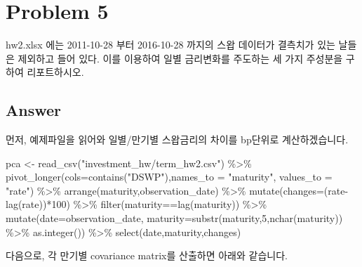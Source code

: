 \documentclass[
  a4paper,
  DIV=11,
  numbers=noendperiod]{scrreprt}
\newenvironment{Shaded}{\begin{snugshade}}{\end{snugshade}}
\newcommand{\AttributeTok}[1]{\textcolor[rgb]{0.40,0.45,0.13}{#1}}
\newcommand{\DecValTok}[1]{\textcolor[rgb]{0.68,0.00,0.00}{#1}}
\newcommand{\FunctionTok}[1]{\textcolor[rgb]{0.28,0.35,0.67}{#1}}
\newcommand{\NormalTok}[1]{\textcolor[rgb]{0.00,0.23,0.31}{#1}}
\newcommand{\OtherTok}[1]{\textcolor[rgb]{0.00,0.23,0.31}{#1}}
\newcommand{\SpecialCharTok}[1]{\textcolor[rgb]{0.37,0.37,0.37}{#1}}
\newcommand{\StringTok}[1]{\textcolor[rgb]{0.13,0.47,0.30}{#1}}
\begin{document}
\section*{Problem 5}\label{problem-5}


hw2.xlsx 에는 2011-10-28 부터 2016-10-28 까지의 스왑 데이터가 결측치가
있는 날들은 제외하고 들어 있다. 이를 이용하여 일별 금리변화를 주도하는
세 가지 주성분을 구하여 리포트하시오.

\subsection*{Answer}\label{answer-9}

먼저, 예제파일을 읽어와 일별/만기별 스왑금리의 차이를 bp단위로
계산하겠습니다.

\begin{Shaded}
\begin{Highlighting}[]
\NormalTok{pca }\OtherTok{\textless{}{-}} \FunctionTok{read\_csv}\NormalTok{(}\StringTok{"investment\_hw/term\_hw2.csv"}\NormalTok{) }\SpecialCharTok{\%\textgreater{}\%} 
  \FunctionTok{pivot\_longer}\NormalTok{(}\AttributeTok{cols=}\FunctionTok{contains}\NormalTok{(}\StringTok{"DSWP"}\NormalTok{),}\AttributeTok{names\_to =} \StringTok{"maturity"}\NormalTok{, }\AttributeTok{values\_to =} \StringTok{"rate"}\NormalTok{) }\SpecialCharTok{\%\textgreater{}\%} 
  \FunctionTok{arrange}\NormalTok{(maturity,observation\_date) }\SpecialCharTok{\%\textgreater{}\%} 
  \FunctionTok{mutate}\NormalTok{(}\AttributeTok{changes=}\NormalTok{(rate}\SpecialCharTok{{-}}\FunctionTok{lag}\NormalTok{(rate))}\SpecialCharTok{*}\DecValTok{100}\NormalTok{) }\SpecialCharTok{\%\textgreater{}\%} 
  \FunctionTok{filter}\NormalTok{(maturity}\SpecialCharTok{==}\FunctionTok{lag}\NormalTok{(maturity)) }\SpecialCharTok{\%\textgreater{}\%} 
  \FunctionTok{mutate}\NormalTok{(}\AttributeTok{date=}\NormalTok{observation\_date,}
         \AttributeTok{maturity=}\FunctionTok{substr}\NormalTok{(maturity,}\DecValTok{5}\NormalTok{,}\FunctionTok{nchar}\NormalTok{(maturity)) }\SpecialCharTok{\%\textgreater{}\%} \FunctionTok{as.integer}\NormalTok{()) }\SpecialCharTok{\%\textgreater{}\%} 
  \FunctionTok{select}\NormalTok{(date,maturity,changes)}
\end{Highlighting}
\end{Shaded}

다음으로, 각 만기별 covariance matrix를 산출하면 아래와 같습니다.
\end{document}
